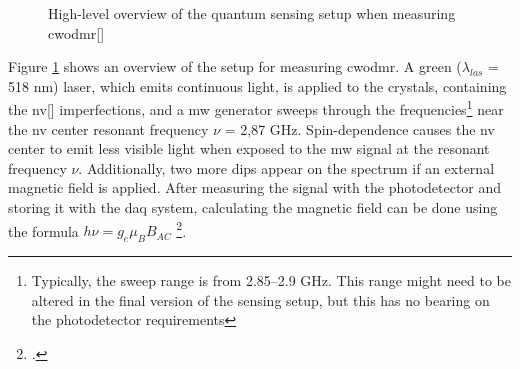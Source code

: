 \begin{figure}[ht]
	\centering
	\caption{High-level overview of the quantum sensing setup when measuring \gls{cwodmr}[]}
	\label{fig:fd:cwodmr_block}
\end{figure}

Figure \ref{fig:fd:cwodmr_block} shows an overview of the setup for measuring \gls{cwodmr}. A green ($\lambda_{las}$ = 518 \unit[]{\nano\metre}) laser, which emits continuous light, is applied to the crystals, containing the \gls{nv}[] imperfections, and a \gls{mw} generator sweeps through the frequencies\footnote{Typically, the sweep range is from \numrange{2,85}{2,9} \unit{\giga\hertz}. This range might need to be altered in the final version of the sensing setup, but this has no bearing on the photodetector requirements}  near the \gls{nv} center resonant frequency $\nu$ = 2,87 \unit[]{\giga\hertz}. Spin-dependence causes the \gls{nv} center to emit less visible light when exposed to the \gls{mw} signal at the resonant frequency $\nu$. Additionally, two more dips appear on the spectrum if an external magnetic field is applied. After measuring the signal with the photodetector and storing it with the \gls{daq} system, calculating the magnetic field can be done using the formula $h\nu = g_e\mu_BB_{AC}$ \footcite[In the formula, $h$ is the Planck constant, $g_e$ is the g-factor of the electron and $\mu_B$ is the Bohr magneton. Knowing all other variables, $B_{AC}$ can easily be calculated.]{enwiki:1301371272}. 


